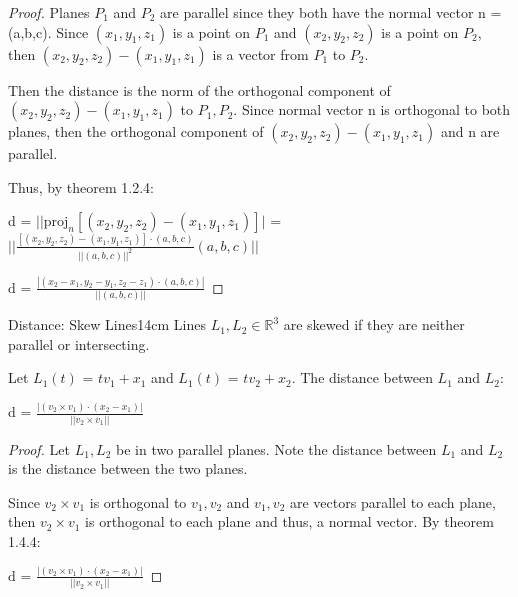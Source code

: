     \begin{proof}
        Planes $P_1$ and $P_2$ are parallel since they both have the normal vector
        n = (a,b,c).
        Since $(x_1,y_1,z_1)$ is a point on $P_1$ and
        $(x_2,y_2,z_2)$ is a point on $P_2$, then
        $(x_2,y_2,z_2) - (x_1,y_1,z_1)$ is a vector from $P_1$ to $P_2$.

        Then the distance is the norm of the orthogonal component of
        $(x_2,y_2,z_2) - (x_1,y_1,z_1)$ to $P_1,P_2$.
        Since normal vector n is orthogonal to both planes, then
        the orthogonal component of $(x_2,y_2,z_2) - (x_1,y_1,z_1)$
        and n are parallel.
        
        Thus, by {\color{red} theorem 1.2.4}:

        \hspace{0.5cm}
        d = $||\text{proj}_n[(x_2,y_2,z_2) - (x_1,y_1,z_1)]|$
        = $||\frac{[(x_2,y_2,z_2) - (x_1,y_1,z_1)] \cdot (a,b,c)}
                    {||(a,b,c)||^2}(a,b,c)||$

        \hspace{0.5cm}
        d = $\frac{|(x_2-x_1,y_2-y_1,z_2-z_1) \cdot (a,b,c)|}
        {||(a,b,c)||}$
    \end{proof}

    \vspace{0.5cm}



    \begin{wtheorem}{Distance: Skew Lines}{14cm}
        Lines $L_1,L_2 \in \mathbb{R}^3$ are skewed if they are neither parallel
        or intersecting.

        Let $L_1(t)$ = $tv_1 + x_1$ and $L_1(t)$ = $tv_2 + x_2$.
        The distance between $L_1$ and $L_2$:

        \hspace{0.5cm}
        d = $\frac{| (v_2 \times v_1) \cdot (x_2-x_1) |}{||v_2 \times v_1||}$
    \end{wtheorem}

    \begin{proof}
        Let $L_1,L_2$ be in two parallel planes.
        Note the distance between $L_1$ and $L_2$ is the distance between
        the two planes.

        Since $v_2 \times v_1$ is orthogonal to $v_1,v_2$ and $v_1,v_2$ are
        vectors parallel to each plane, then $v_2 \times v_1$ is orthogonal to
        each plane and thus, a normal vector.
        By {\color{red} theorem 1.4.4}:

        \hspace{0.5cm}
        d = $\frac{| (v_2 \times v_1) \cdot (x_2-x_1) |}{||v_2 \times v_1||}$
    \end{proof}

